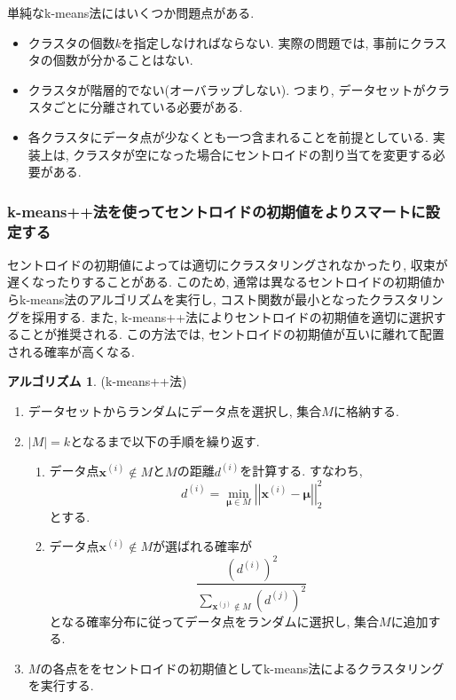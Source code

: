 \documentclass[uplatex]{jsarticle}
\theoremstyle{definition}
\newtheorem{algorithm}[definition]{アルゴリズム}
\numberwithin{equation}{section}
\newcommand{\norm}[1]{\left|\left|#1\right|\right|}
\begin{document}
単純なk-means法にはいくつか問題点がある.
\begin{itemize}
    \item
    クラスタの個数$k$を指定しなければならない.
    実際の問題では, 事前にクラスタの個数が分かることはない.

    \item
    クラスタが階層的でない(オーバラップしない).
    つまり, データセットがクラスタごとに分離されている必要がある.

    \item
    各クラスタにデータ点が少なくとも一つ含まれることを前提としている.
    実装上は, クラスタが空になった場合にセントロイドの割り当てを変更する必要がある.
\end{itemize}

\subsubsection{k-means++法を使ってセントロイドの初期値をよりスマートに設定する}
セントロイドの初期値によっては適切にクラスタリングされなかったり, 収束が遅くなったりすることがある.
このため, 通常は異なるセントロイドの初期値からk-means法のアルゴリズムを実行し, コスト関数が最小となったクラスタリングを採用する.
また, k-means++法によりセントロイドの初期値を適切に選択することが推奨される.
この方法では, セントロイドの初期値が互いに離れて配置される確率が高くなる.

\begin{algorithm}
    (k-means++法)
    \begin{enumerate}
        \item
        データセットからランダムにデータ点を選択し, 集合$M$に格納する.

        \item
        $|M| = k$となるまで以下の手順を繰り返す.

        \begin{enumerate}
            \item
            データ点$\bm{x}^{(i)} \notin M$と$M$の距離$d^{(i)}$を計算する.
            すなわち, 
            \begin{equation}
                d^{(i)} = \min_{\bm{\mu} \in M} \norm{\bm{x}^{(i)} - \bm{\mu}}_{2}^{2}
            \end{equation}
            とする.

            \item
            データ点$\bm{x}^{(i)} \notin M$が選ばれる確率が
            \begin{equation}
                \frac{(d^{(i)})^{2}}{\sum_{\bm{x}^{(j)} \notin M} (d^{(j)})^{2}}
            \end{equation}
            となる確率分布に従ってデータ点をランダムに選択し, 集合$M$に追加する.
        \end{enumerate}

        \item
        $M$の各点ををセントロイドの初期値としてk-means法によるクラスタリングを実行する.
    \end{enumerate}
\end{algorithm}
\end{document}
